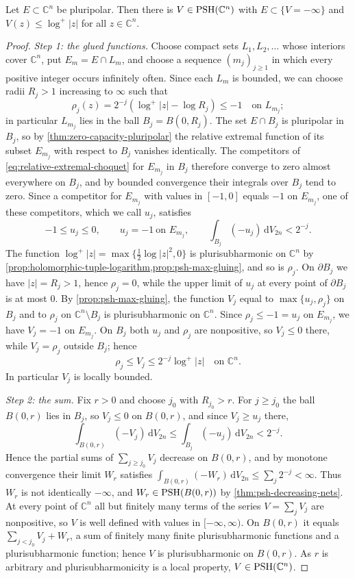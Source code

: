 \begin{theorem}[Josefson]\label{thm:josefson}
Let $E\subset\mathbb C^n$ be pluripolar. Then there is $V\in\mathrm{PSH}(\mathbb C^n)$ with $E\subset\{V=-\infty\}$ and $V(z)\le\log^+|z|$ for all $z\in\mathbb C^n$.
\end{theorem}
\begin{proof}
\emph{Step 1: the glued functions.} Choose compact sets $L_1,L_2,\ldots$ whose interiors cover $\mathbb C^n$, put $E_m=E\cap L_m$, and choose a sequence $(m_j)_{j\ge1}$ in which every positive integer occurs infinitely often. Since each $L_m$ is bounded, we can choose radii $R_j>1$ increasing to $\infty$ such that
\[
 \rho_j(z)=2^{-j}(\log^+|z|-\log R_j)\le-1\quad\text{on }L_{m_j};
\]
in particular $L_{m_j}$ lies in the ball $B_j=B(0,R_j)$. The set $E\cap B_j$ is pluripolar in $B_j$, so by \cref{thm:zero-capacity-pluripolar} the relative extremal function of its subset $E_{m_j}$ with respect to $B_j$ vanishes identically. The competitors of \eqref{eq:relative-extremal-choquet} for $E_{m_j}$ in $B_j$ therefore converge to zero almost everywhere on $B_j$, and by bounded convergence their integrals over $B_j$ tend to zero. Since a competitor for $E_{m_j}$ with values in $[-1,0]$ equals $-1$ on $E_{m_j}$, one of these competitors, which we call $u_j$, satisfies
\[
 -1\le u_j\le0,\qquad u_j=-1\ \text{on }E_{m_j},
 \qquad\int_{B_j}(-u_j)\,\mathrm dV_{2n}<2^{-j}.
\]
The function $\log^+|z|=\max\{\tfrac12\log|z|^2,0\}$ is plurisubharmonic on $\mathbb C^n$ by \cref{prop:holomorphic-tuple-logarithm,prop:psh-max-gluing}, and so is $\rho_j$. On $\partial B_j$ we have $|z|=R_j>1$, hence $\rho_j=0$, while the upper limit of $u_j$ at every point of $\partial B_j$ is at most $0$. By \cref{prop:psh-max-gluing}, the function $V_j$ equal to $\max\{u_j,\rho_j\}$ on $B_j$ and to $\rho_j$ on $\mathbb C^n\setminus B_j$ is plurisubharmonic on $\mathbb C^n$. Since $\rho_j\le-1=u_j$ on $E_{m_j}$, we have $V_j=-1$ on $E_{m_j}$. On $B_j$ both $u_j$ and $\rho_j$ are nonpositive, so $V_j\le0$ there, while $V_j=\rho_j$ outside $B_j$; hence
\[
 \rho_j\le V_j\le2^{-j}\log^+|z|\quad\text{on }\mathbb C^n.
\]
In particular $V_j$ is locally bounded.

\emph{Step 2: the sum.} Fix $r>0$ and choose $j_0$ with $R_{j_0}>r$. For $j\ge j_0$ the ball $B(0,r)$ lies in $B_j$, so $V_j\le0$ on $B(0,r)$, and since $V_j\ge u_j$ there,
\[
 \int_{B(0,r)}(-V_j)\,\mathrm dV_{2n}\le\int_{B_j}(-u_j)\,\mathrm dV_{2n}<2^{-j}.
\]
Hence the partial sums of $\sum_{j\ge j_0}V_j$ decrease on $B(0,r)$, and by monotone convergence their limit $W_r$ satisfies $\int_{B(0,r)}(-W_r)\,\mathrm dV_{2n}\le\sum_j2^{-j}<\infty$. Thus $W_r$ is not identically $-\infty$, and $W_r\in\mathrm{PSH}(B(0,r))$ by \cref{thm:psh-decreasing-nets}. At every point of $\mathbb C^n$ all but finitely many terms of the series $V=\sum_jV_j$ are nonpositive, so $V$ is well defined with values in $[-\infty,\infty)$. On $B(0,r)$ it equals $\sum_{j<j_0}V_j+W_r$, a sum of finitely many finite plurisubharmonic functions and a plurisubharmonic function; hence $V$ is plurisubharmonic on $B(0,r)$. As $r$ is arbitrary and plurisubharmonicity is a local property, $V\in\mathrm{PSH}(\mathbb C^n)$.


\end{proof}

